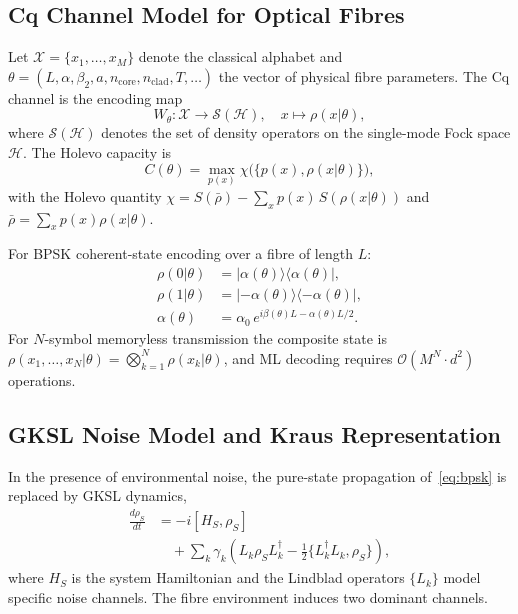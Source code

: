 \documentclass[journal,twocolumn]{IEEEtran}
\theoremstyle{definition}
\theoremstyle{plain}
\newcommand{\calH}{\mathcal{H}}
\begin{document}
\subsection{Cq Channel Model for Optical Fibres}

Let $\mathcal{X} = \{x_1, \dots, x_M\}$ denote the classical
alphabet and $\theta = (L, \alpha, \beta_2, a, n_{\mathrm{core}},
n_{\mathrm{clad}}, T, \ldots)$ the vector of physical fibre
parameters.  The Cq channel is the encoding map
\begin{equation}
  W_\theta : \mathcal{X} \to \mathcal{S}(\calH), \quad
  x \mapsto \rho(x|\theta),
  \label{eq:cq_channel}
\end{equation}
where $\mathcal{S}(\calH)$ denotes the set of density operators on
the single-mode Fock space $\calH$.  The Holevo capacity is
\begin{equation}
  C(\theta) = \max_{p(x)} \chi\bigl(\{p(x), \rho(x|\theta)\}\bigr),
  \label{eq:holevo_capacity}
\end{equation}
with the Holevo quantity
$\chi = S(\bar\rho) - \sum_x p(x)\, S(\rho(x|\theta))$ and
$\bar\rho = \sum_x p(x)\rho(x|\theta)$.

For BPSK coherent-state encoding over a fibre of length $L$:
\begin{align}
  \rho(0|\theta) &= |\alpha(\theta)\rangle\langle\alpha(\theta)|,
  \nonumber\\
  \rho(1|\theta) &= |-\alpha(\theta)\rangle\langle-\alpha(\theta)|,
  \label{eq:bpsk}\\
  \alpha(\theta) &= \alpha_0\,e^{i\beta(\theta)L - \alpha(\theta)L/2}.
  \nonumber
\end{align}
For $N$-symbol memoryless transmission the composite state is
$\rho(x_1,\dots,x_N|\theta) = \bigotimes_{k=1}^N \rho(x_k|\theta)$,
and ML decoding requires $\mathcal{O}(M^N \cdot d^2)$ operations.

\subsection{GKSL Noise Model and Kraus Representation}

In the presence of environmental noise, the pure-state propagation
of~\eqref{eq:bpsk} is replaced by GKSL dynamics,
\begin{align}
  \frac{d\rho_S}{dt} &= -i[H_S, \rho_S] \nonumber\\
  &\quad + \sum_k \gamma_k \!\left(L_k \rho_S L_k^\dagger
    - \tfrac{1}{2}\{L_k^\dagger L_k, \rho_S\}\right),
  \label{eq:GKSL}
\end{align}
where $H_S$ is the system Hamiltonian and the Lindblad operators
$\{L_k\}$ model specific noise channels.  The fibre environment
induces two dominant channels.
\end{document}
